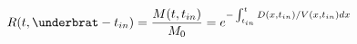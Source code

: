 \begin{equation}
R(t,\underbrat-t_{in}) = \frac{M(t,t_{in})}{M_0} = e^{-\int_{t_{in}}^t D(x,t_{in})/V(x,t_{in}) dx}
\end{equation}